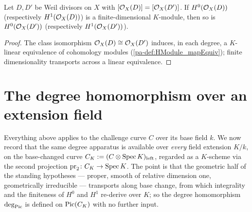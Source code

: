 \begin{theorem}
  \label{pa-thm:moduleFinite_hModule_divisorSheaf_class}
  \leanok

  Let \(D, D'\) be Weil divisors on \(X\) with \([\mathcal{O}_{X}(D)] = [\mathcal{O}_{X}(D')]\). If
  \(H^0(\mathcal{O}_{X}(D))\) (respectively \(H^1(\mathcal{O}_{X}(D))\)) is a finite-dimensional
  \(K\)-module, then so is \(H^0(\mathcal{O}_{X}(D'))\) (respectively \(H^1(\mathcal{O}_{X}(D'))\)).
\end{theorem}
\begin{proof}
  \leanok
  The class isomorphism \(\mathcal{O}_{X}(D) \cong \mathcal{O}_{X}(D')\) induces, in each degree, a
  \(K\)-linear equivalence of cohomology modules (\ref{pa-def:HModule_mapEquiv}); finite
  dimensionality transports across a linear equivalence.
\end{proof}

\section{The degree homomorphism over an extension field}

Everything above applies to the challenge curve \(C\) over its base field \(k\). We now record
that the same degree apparatus is available over \emph{every} field extension \(K/k\), on the
base-changed curve \(C_K := (C \otimes \operatorname{Spec} K)_{\mathrm{left}}\), regarded as a \(K\)-scheme via
the second projection \(\mathrm{pr}_2 \colon C_K \to \operatorname{Spec} K\). The point is that the geometric
half of the standing hypotheses --- proper, smooth of relative dimension one, geometrically
irreducible --- transports along base change, from which integrality and the finiteness of
\(H^0\) and \(H^1\) re-derive over \(K\); so the degree homomorphism \(\deg_{\operatorname{Pic}}\) is defined on
\(\operatorname{Pic}(C_K)\) with no further input.

